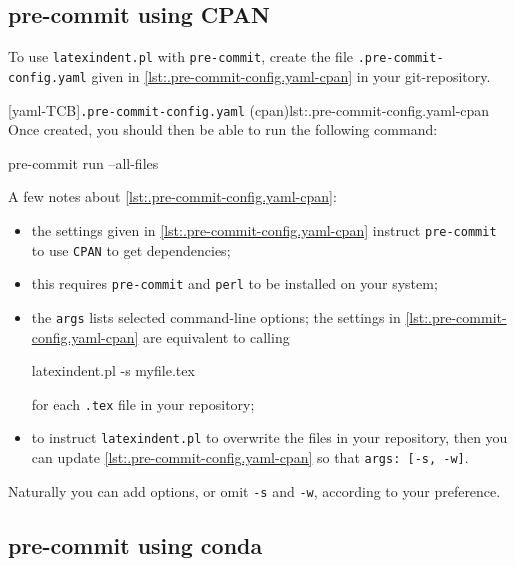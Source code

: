  \subsection{pre-commit using CPAN}\label{sec:pre-commit-cpan}

  To use \texttt{latexindent.pl} with \texttt{pre-commit}, create the file
  \texttt{.pre-commit-config.yaml} given in \cref{lst:.pre-commit-config.yaml-cpan} in
  your git-repository.   

  [yaml-TCB]{\texttt{.pre-commit-config.yaml} (cpan)}{lst:.pre-commit-config.yaml-cpan}
  Once created, you should then be able to run the following command:

  \begin{commandshell}
pre-commit run --all-files
\end{commandshell}

  A few notes about \cref{lst:.pre-commit-config.yaml-cpan}:
  \begin{itemize}
   \item the settings given in \cref{lst:.pre-commit-config.yaml-cpan} instruct
         \texttt{pre-commit} to use \texttt{CPAN} to get dependencies;
   \item this requires \texttt{pre-commit} and \texttt{perl} to be installed on your
         system;
   \item the \texttt{args} lists selected command-line options; the settings in
         \cref{lst:.pre-commit-config.yaml-cpan} are equivalent to calling

         \begin{commandshell}
latexindent.pl -s myfile.tex
\end{commandshell}

         for each \texttt{.tex} file in your repository;
   \item to instruct \texttt{latexindent.pl} to overwrite the files in your repository,
         then you can update \cref{lst:.pre-commit-config.yaml-cpan} so that
         \texttt{args: [-s, -w]}.
  \end{itemize}

  Naturally you can add options, or omit \texttt{-s} and \texttt{-w}, according to your
  preference.

 \subsection{pre-commit using conda}\label{sec:pre-commit-conda}

